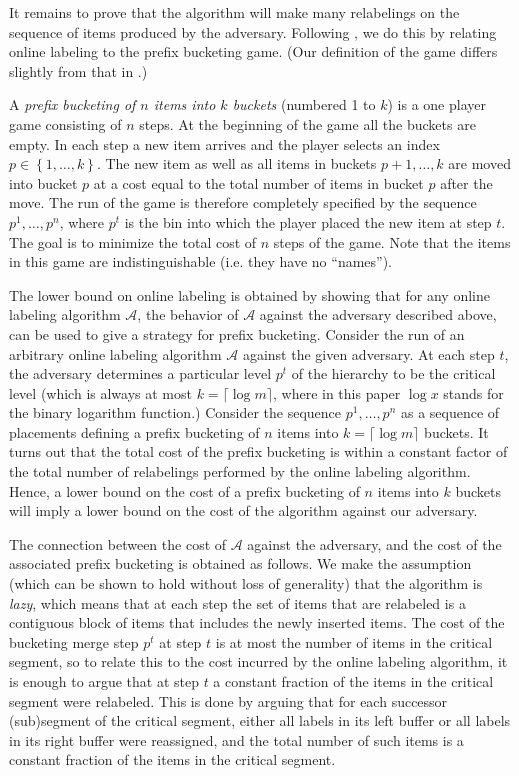 \documentclass[unicode,review]{siamart1116}
\newcommand{\A}{\mathcal{A}}
\newcommand{\natInt}[2]{ \left\{ #1, \dotsc, #2 \right\} }
\numberwithin{theorem}{section}
\begin{document}
It remains to prove that the algorithm will make many relabelings on the sequence
of items produced by the adversary.  Following  \cite{DSZ04}, we 
do this by relating online labeling to the prefix bucketing game.
(Our definition of the game differs slightly from that in \cite{DSZ04}.)

A \emph{prefix bucketing of $n$ items into $k$ buckets} (numbered 1 to $k$) is a one player game consisting of $n$ steps.
At the beginning of the game
all the buckets are empty. In each step a new item arrives and the player selects an index $p \in \natInt{1}{k}$.
The new item as well as all items in buckets $p+1,\dotsc,k$ are moved into bucket $p$ at a cost equal to the
total number of items in bucket $p$ after the move.   The run of the game is therefore completely specified by
the sequence $p^1,\ldots,p^n$, where $p^t$ is the bin into which the player placed the new item at step $t$. 
The goal is to minimize the total cost of $n$ steps
of the game.   
Note that the items in this game are indistinguishable (i.e. they have no ``names'').

The lower bound on online labeling is obtained by showing that for any online
labeling algorithm $\A$, the behavior of $\A$ against the adversary described above, can be used to
give a strategy for prefix bucketing.
Consider the run of an arbitrary online labeling algorithm $\A$
against the given adversary.  At each step $t$, the adversary determines a particular
level $p^t$ of the hierarchy to be the critical level (which is always at most $k=\lceil \log m \rceil$,
where in this paper $\log x$ stands for the binary logarithm function.)
 Consider the sequence $p^1,\ldots,p^n$ as a  sequence of placements defining a prefix bucketing
of $n$ items into $k=\lceil \log m \rceil$ buckets. It turns out that
the total cost of the prefix bucketing is within a constant factor of  the total number of relabelings
performed by the online labeling algorithm. Hence, a lower bound on the cost of a prefix bucketing of $n$ items into $k$
buckets will imply a lower bound on the cost of the algorithm against our adversary.

The connection between the cost of $\A$ against the adversary, and the cost of the associated
prefix bucketing is obtained as follows.
We  make the assumption (which can be shown to hold without loss of generality) that the algorithm is \emph{lazy}, which means
that at each  step the set of items that are relabeled is a contiguous block of items that includes
the newly inserted items.    The cost of the bucketing merge step $p^t$ at step $t$ 
is at most the number of items in
the critical segment, so to relate this to the cost incurred by the online labeling algorithm, it is enough
to argue that at step $t$ a constant fraction of the items in the critical segment were relabeled.  This is done
by arguing that  for each successor (sub)segment of the critical segment, either all labels in its left buffer
or all labels in its right buffer were reassigned, and the total number of such items is a constant fraction of the items
in the critical segment.
\end{document}

